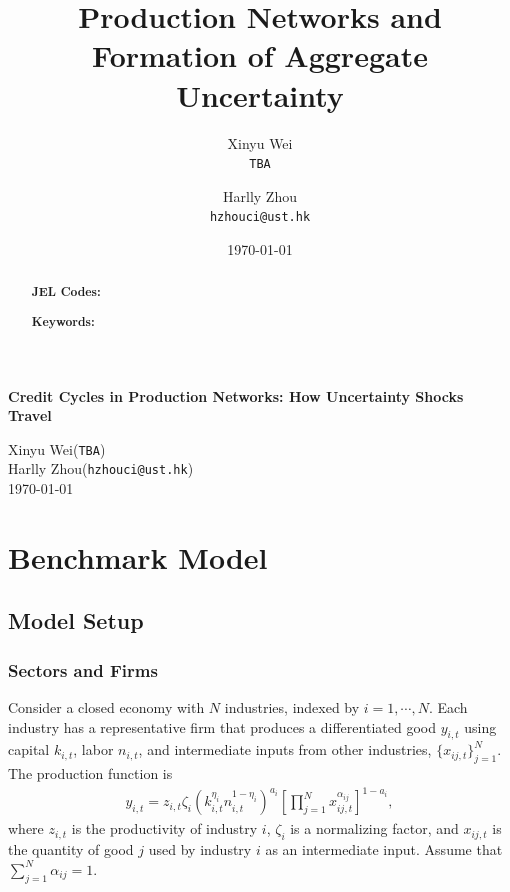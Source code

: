 \documentclass[12pt]{article}
\title{Production Networks and Formation of Aggregate Uncertainty}
\author{
Xinyu Wei\footnotemark[1]\\\texttt{TBA}
\and
Harlly Zhou\footnotemark[2]\\\texttt{hzhouci@ust.hk}
}
\date{\today}
\numberwithin{equation}{section}
\begin{document}
\begin{titlepage}
    \begin{center}
        {\LARGE\bfseries Credit Cycles in Production Networks: How Uncertainty Shocks Travel\par}
        \vspace{1.5em}
        {\large
        Xinyu Wei\footnotemark[1] (\texttt{TBA})\\
        Harlly Zhou\footnotemark[2] (\texttt{hzhouci@ust.hk})\\
        }
        \vspace{1em}
        \today
    \end{center}
    \vspace{2em}
    \begin{abstract}
        \sloppy
        \noindent 
         \vspace{1em}

        \noindent\textbf{JEL Codes:} 


        \noindent\textbf{Keywords:} 
        \fussy
    \end{abstract}
    \thispagestyle{empty}
    \setcounter{page}{0}
\end{titlepage}


\section{Benchmark Model}\label{sec:benchmark_model}
\subsection{Model Setup}
\subsubsection{Sectors and Firms}

Consider a closed economy with $N$ industries, indexed by $i=1,\cdots,N$. Each industry has a representative firm that produces a differentiated good $y_{i,t}$ using capital $k_{i,t}$, labor $n_{i,t}$, and intermediate inputs from other industries, $\{x_{ij,t}\}_{j=1}^{N}$. The production function is
\begin{align}\label{eq:prod_func}
    y_{i,t}
    =
    z_{i,t}\zeta_i
    \left(
        k_{i,t}^{\eta_i}n_{i,t}^{1-\eta_i}
    \right)^{a_i}
    \left[
        \prod_{j=1}^{N}
        x_{ij,t}^{\alpha_{ij}}
    \right]^{1-a_i},
\end{align}
where $z_{i,t}$ is the productivity of industry $i$, $\zeta_i$ is a normalizing factor, and $x_{ij,t}$ is the quantity of good $j$ used by industry $i$ as an intermediate input. Assume that $\sum_{j=1}^{N}\alpha_{ij}=1$.
\end{document}
